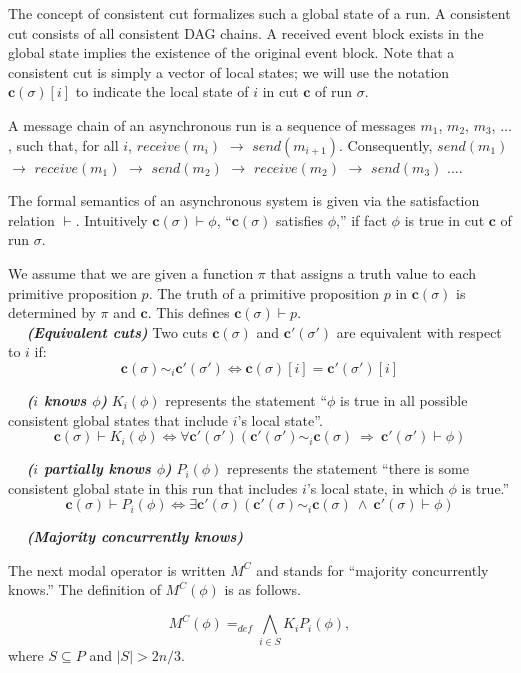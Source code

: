 \documentclass{article}
\newcommand{\dfnn}[2]{$\quad$ \textbf{\emph{(#1)}} {#2}}
\renewcommand{\vec}[1]{\mathbf{#1}}
\begin{document}
The concept of consistent cut formalizes such a global state of a run. A consistent cut consists of all consistent DAG chains. A received event block exists in the global state implies the existence of the original event block. Note that a consistent cut is simply a vector of local states; we will use the notation $\vec{c}(\sigma)[i]$ to indicate the local state of $i$ in cut $\vec{c}$ of run $\sigma$.

A message chain of an asynchronous run is a sequence of messages $m_1$, $m_2$, $m_3$, $\dots$, such that, for all $i$, $receive(m_i)$ $\rightarrow$  $send(m_{i+1})$. Consequently, $send(m_1)$ $\rightarrow$ $receive(m_1)$ $\rightarrow$ $send(m_2)$ $\rightarrow$ $receive(m_2)$ $\rightarrow$ $send(m_3)$ $\dots$.

The formal semantics of an asynchronous system is given via  the satisfaction relation $\vdash$. Intuitively $\vec{c}(\sigma) \vdash \phi$, ``$\vec{c}(\sigma)$ satisfies $\phi$,'' if fact $\phi$ is true in cut $\vec{c}$ of run $\sigma$.

We assume that we are given a function $\pi$ that assigns a truth value to each primitive proposition $p$. The truth of a primitive proposition $p$ in $\vec{c}(\sigma)$ is determined by $\pi$ and $\vec{c}$. This defines $\vec{c}(\sigma) \vdash p$.\\

\dfnn{Equivalent cuts}{Two cuts $\vec{c}(\sigma)$ and $\vec{c'}(\sigma')$ are equivalent  with respect to $i$ if: $$\vec{c}(\sigma) \sim_i \vec{c'}(\sigma') \Leftrightarrow \vec{c}(\sigma)[i] = \vec{c'}(\sigma')[i]$$}

\dfnn{$i$ knows $\phi$}{$K_i(\phi)$ represents the statement ``$\phi$ is true in all possible consistent global states that include $i$’s local state''. 
$$\vec{c}(\sigma) \vdash K_i(\phi) \Leftrightarrow \forall \vec{c'}(\sigma')   (\vec{c'}(\sigma') \sim_i \vec{c}(\sigma) \ \Rightarrow\ \vec{c'}(\sigma') \vdash \phi) $$}

\dfnn{$i$ partially knows $\phi$}{$P_i(\phi)$ represents the statement ``there is some consistent global state in this run that includes $i$’s local state, in which $\phi$ is true.''
$$\vec{c}(\sigma) \vdash P_i(\phi) \Leftrightarrow \exists \vec{c'}(\sigma) ( \vec{c'}(\sigma) \sim_i \vec{c}(\sigma) \ \wedge\ \vec{c'}(\sigma) \vdash \phi )$$}
		
\dfnn{Majority concurrently knows}{The next modal operator is written $M^C$ and stands for ``majority concurrently knows.''
The definition of $M^C(\phi)$ is as follows.

$$M^C(\phi) =_{def} \bigwedge_{i \in S} K_i P_i(\phi), $$ where $S \subseteq P$ and $|S| > 2n/3$.}
\end{document}
